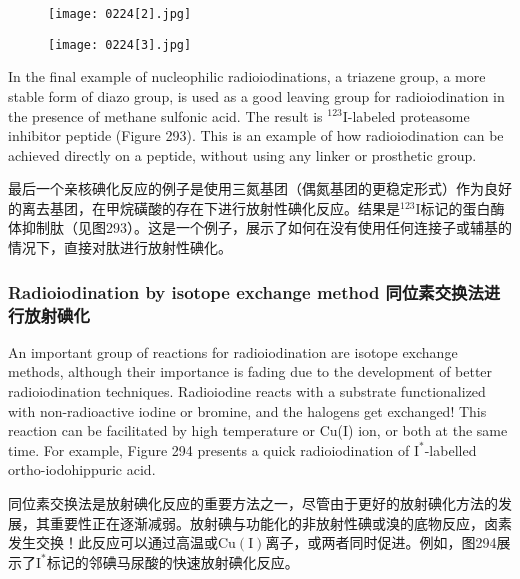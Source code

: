 \documentclass[dvipsnames, svgnames,a4paper,11pt]{article}
\begin{document}
\begin{figure}[h]
	\centering
    \texttt{[image: 0224[2].jpg]}  
     \label{fig292}
\end{figure}

\begin{figure}[h]
	\centering
    \texttt{[image: 0224[3].jpg]}  
     \label{fig293}
\end{figure}

In the final example of nucleophilic radioiodinations, a triazene group, a more stable form of diazo group, is used as a good leaving group for radioiodination in the presence of methane sulfonic acid. The result is \(\mathrm{^{123}I}\)-labeled proteasome inhibitor peptide (Figure 293). This is an example of how radioiodination can be achieved directly on a peptide, without using any linker or prosthetic group.

最后一个亲核碘化反应的例子是使用三氮基团（偶氮基团的更稳定形式）作为良好的离去基团，在甲烷磺酸的存在下进行放射性碘化反应。结果是\(\mathrm{^{123}I}\)标记的蛋白酶体抑制肽（见图293）。这是一个例子，展示了如何在没有使用任何连接子或辅基的情况下，直接对肽进行放射性碘化。



\subsubsection{Radioiodination by isotope exchange method 同位素交换法进行放射碘化}  
An important group of reactions for radioiodination are isotope exchange methods, although their importance is fading due to the development of better radioiodination techniques. Radioiodine reacts with a substrate functionalized with non-radioactive iodine or bromine, and the halogens get exchanged! This reaction can be facilitated by high temperature or Cu(I) ion, or both at the same time. For example, Figure 294 presents a quick radioiodination of \(\mathrm{I}^*\)-labelled ortho-iodohippuric acid.  

同位素交换法是放射碘化反应的重要方法之一，尽管由于更好的放射碘化方法的发展，其重要性正在逐渐减弱。放射碘与功能化的非放射性碘或溴的底物反应，卤素发生交换！此反应可以通过高温或\(\mathrm{Cu(I)}\)离子，或两者同时促进。例如，图294展示了\(\mathrm{I}^*\)标记的邻碘马尿酸的快速放射碘化反应。  
\end{document}
